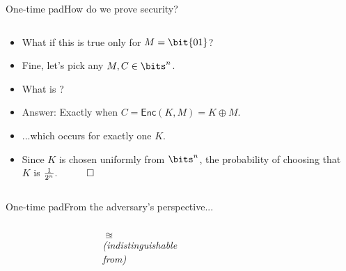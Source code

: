 \documentclass[aspectratio=169, lualatex, handout]{beamer}
\begin{document}
\begin{frame}{One-time pad}{How do we prove security?}
	\begin{columns}[c]
		\begin{column}{0.7\textwidth}
			\begin{itemize}[<+->]
				\item What if this is true only for $M = \bit{01}$?
				\item Fine, let's pick any $M, C \in \bits^n$.
				\item What is ?
				\item Answer: Exactly when $C = \textsf{Enc}(K, M) = K \oplus M$.
				\item ...which occurs for exactly one $K$.
				\item Since $K$ is chosen uniformly from $\bits^n$, the probability of choosing that $K$ is $\frac{1}{2^n}. \quad \qed$
			\end{itemize}
		\end{column}
		\begin{column}{0.3\textwidth}
		\end{column}
	\end{columns}
\end{frame}

\begin{frame}{One-time pad}{From the adversary's perspective...}
	\begin{columns}[c]
		\begin{column}{0.35\textwidth}
		\end{column}
		\begin{column}{0.3\textwidth}
			\begin{center}
				{\huge{$\approxeq$}} \\[1em]
				{\scriptsize\textit{(indistinguishable \\ from)}}
			\end{center}
		\end{column}
		\begin{column}{0.35\textwidth}
		\end{column}
	\end{columns}
\end{frame}
\end{document}
